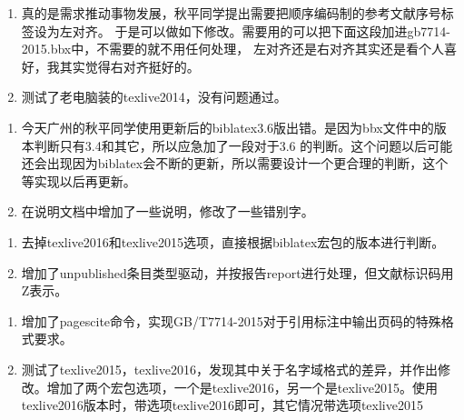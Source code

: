 \begin{enumerate}
\item 真的是需求推动事物发展，秋平同学提出需要把顺序编码制的参考文献序号标签设为左对齐。
于是可以做如下修改。需要用的可以把下面这段加进gb7714-2015.bbx中，不需要的就不用任何处理，
左对齐还是右对齐其实还是看个人喜好，我其实觉得右对齐挺好的。
\begin{texlist}
\end{texlist}

\item 测试了老电脑装的texlive2014，没有问题通过。
\end{enumerate}

\begin{enumerate}
\item 今天广州的秋平同学使用更新后的biblatex3.6版出错。是因为bbx文件中的版本判断只有3.4和其它，所以应急加了一段对于3.6 的判断。这个问题以后可能还会出现因为biblatex会不断的更新，所以需要设计一个更合理的判断，这个等实现以后再更新。

\item 在说明文档中增加了一些说明，修改了一些错别字。
\end{enumerate}

\begin{enumerate}
\item 去掉texlive2016和texlive2015选项，直接根据biblatex宏包的版本进行判断。

\item 增加了unpublished条目类型驱动，并按报告report进行处理，但文献标识码用Z表示。
\end{enumerate}

\begin{enumerate}
\item 增加了pagescite命令，实现GB/T7714-2015对于引用标注中输出页码的特殊格式要求。

\item 测试了texlive2015，texlive2016，发现其中关于名字域格式的差异，并作出修改。增加了两个宏包选项，一个是texlive2016，另一个是texlive2015。使用texlive2016版本时，带选项texlive2016即可，其它情况带选项texlive2015
\end{enumerate}

